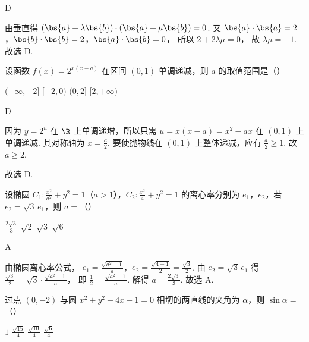 \begin{answer}
D
\end{answer}

\begin{solution}
由垂直得
\((\bs{a}+\lambda\bs{b})\cdot(\bs{a}+\mu\bs{b})=0\).
又
\(\bs{a}\cdot\bs{a}=2\)，\(\bs{b}\cdot\bs{b}=2\)，\(\bs{a}\cdot\bs{b}=0\)，
所以
\(2+2\lambda\mu=0\)，
故 \(\lambda\mu=-1\). 故选 D.
\end{solution}

\begin{problem}
设函数 \(f(x)=2^{x(x-a)}\) 在区间 \((0,1)\) 单调递减，则 \(a\) 的取值范围是（\quad）

\choices
    {\((-\infty,-2]\)}
    {\([-2,0)\)}
    {\((0,2]\)}
    {\([2,+\infty)\)}
\end{problem}

\begin{answer}
D
\end{answer}

\begin{solution}
因为 \(y=2^u\) 在 \(\R\) 上单调递增，所以只需
\(u=x(x-a)=x^2-ax\)
在 \((0,1)\) 上单调递减. 其对称轴为
\(x=\frac{a}{2}\).
要使抛物线在 \((0,1)\) 上整体递减，应有 \(\frac{a}{2}\ge 1\). 故
\(a\ge 2\).


故选 D.
\end{solution}

\begin{problem}
设椭圆 \(C_1:\frac{x^2}{a^2}+y^2=1\)（\(a>1\)），\(C_2:\frac{x^2}{4}+y^2=1\) 的离心率分别为 \(e_1\)，\(e_2\)，若 \(e_2=\sqrt3\,e_1\)，则 \(a=\)（\quad）

\choices
    {\(\frac{2\sqrt3}{3}\)}
    {\(\sqrt2\)}
    {\(\sqrt3\)}
    {\(\sqrt6\)}
\end{problem}

\begin{answer}
A
\end{answer}

\begin{solution}
由椭圆离心率公式，
\(e_1=\frac{\sqrt{a^2-1}}{a}\)，\(e_2=\frac{\sqrt{4-1}}{2}=\frac{\sqrt3}{2}\).
由 \(e_2=\sqrt3\,e_1\) 得
\(\frac{\sqrt3}{2}=\sqrt3\cdot\frac{\sqrt{a^2-1}}{a}\)，
即
\(\frac12=\frac{\sqrt{a^2-1}}{a}\).
解得
\(a=\frac{2\sqrt3}{3}\).
故选 A.
\end{solution}

\begin{problem}
过点 \((0,-2)\) 与圆 \(x^2+y^2-4x-1=0\) 相切的两直线的夹角为 \(\alpha\)，则 \(\sin\alpha=\)（\quad）

\choices
    {\(1\)}
    {\(\frac{\sqrt{15}}{4}\)}
    {\(\frac{\sqrt{10}}{4}\)}
    {\(\frac{\sqrt6}{4}\)}
\end{problem}

